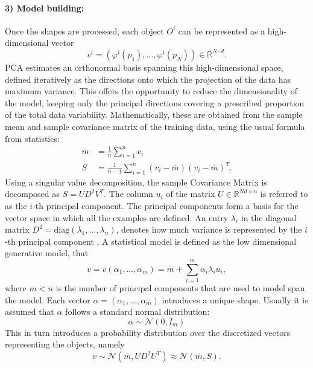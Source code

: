 \documentclass{InsightArticle}
\def\R{\mathds{R}} %
\begin{document}
\paragraph{3) Model building:}
Once the shapes are processed, each object $O^i$ can be
represented as a high-dimensional vector 
\[
v^i = (\varphi^i(p_1), \ldots, \varphi^i(p_N)) \in \R^{N\cdot d}.  
\]
PCA estimates an orthonormal basis spanning this
high-dimensional space, defined iteratively as the directions onto
which the projection of the data has maximum variance. This offers the
opportunity to reduce the dimensionality of the model, keeping only
the principal directions covering a prescribed proportion of the total
data variability.  Mathematically, these are obtained from the sample mean and sample covariance matrix of the 
training data, using the usual formula from statistics:
\begin{equation}
 \begin{split}
   \overline{m} & = \frac{1}{n} \sum_{i=1}^n v_i \\
   S &= \frac{1}{n-1} \sum_{i=1}^n (v_i - \overline{m}) (v_i - \overline{m})^T.
   \end{split}
\end{equation}
Using a singular value decomposition, the sample Covariance Matrix is decomposed
as $S=UD^2V^T$. The column $u_i$ of the 
matrix $U \in \R^{Nd \times {n}}$ is referred to as the $i$-th principal component.
The principal components form a basis for the vector space in which all the examples are defined. 
An entry $\lambda_i$ in the diagonal matrix $D^2 = \text{diag}(\lambda_1, \ldots, \lambda_{n})$,  denotes how much variance is represented by the $i$-th principal component \cite{mardia_multivariate_1980}.
A statistical model is defined as the low dimensional generative model, that
\[
v = v(\alpha_1, \ldots, \alpha_m) = \overline{m}  + \sum_{i=1}^m \alpha_i \lambda_i u_i, 
\]
where $m < n$ is the number of principal components that are used to model span the model. 
Each vector $\alpha = (\alpha_1, \ldots, \alpha_m)$ introduces a unique shape. 
Usually it is assumed that $\alpha$ follows a standard normal distribution: 
\begin{equation} \label{eq:coeff-normal-assumption}
\alpha  \sim \mathcal{N}(0, I_m)
\end{equation}
This in turn introduces a probability distribution over the discretized vectors representing the objects, namely 
\begin{equation} \label{eq:prob-interpretation}
v \sim \mathcal{N}(\overline{m}, UD^2U^T) \approx \mathcal{N}(\overline{m}, S).
\end{equation}
\end{document}

